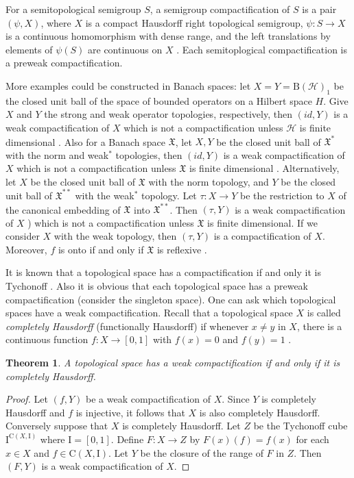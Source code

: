 \documentclass[manuscript]{amsart}
\newtheorem{theorem}{Theorem}[section]
\theoremstyle{definition}
\begin{document}
For a semitopological  semigroup $S$, a semigroup compactification of $S$
is a pair $(\psi,X)$, where $X$ is a compact Hausdorff right topological semigroup,
 $\psi:S\to X$ is a continuous homomorphism with dense range, and the left translations
by elements of $\psi(S)$ are continuous on $X$ \cite[Definition~3.1.1]{bjm89}. Each semitoplogical compactification is a preweak compactification.

More examples could be constructed in Banach spaces: let 
$X=Y=\mathrm{B}(\mathcal{H})_{1}$  be the closed unit ball
of the space of bounded operators on a Hilbert space $H$. Give 
$X$ and $Y$ the strong and weak operator topologies, respectively, then $(id,Y)$ is
a weak compactification of $X$ \cite[Theorem~4.2.4]{mu90} which is not a compactification unless $\mathcal{H}$ is
finite dimensional \cite{ta79}. Also for a Banach space $\mathfrak{X}$, let $X, Y$ be the closed unit ball
of $\mathfrak{X}^{*}$ with the norm and weak$^{*}$ topologies, then $(id,Y)$ is a weak compactification of $X$ which is not a compactification unless $\mathfrak{X}$ is
finite dimensional \cite{co90}.
Alternatively, let  $X$ be the closed unit ball
of $\mathfrak{X}$ with the norm topology, and $Y$ be the closed unit ball
of $\mathfrak{X}^{**}$ with the weak$^{*}$ topology. Let $\tau :X\to Y$ be the restriction to $X$
of the canonical embedding of $\mathfrak{X}$ into $\mathfrak{X}^{**}$. Then $(\tau,Y)$ is a weak compactification of $X$ \cite[Proposition~4.1]{co90}) which is not a compactification unless $\mathfrak{X}$ is
finite dimensional.
If we consider $X$ with  the weak topology, then $(\tau,Y)$ is a compactification of $X$.
Moreover, $f$ is onto if and only if  $\mathfrak{X}$ is reflexive \cite{co90}.

It is known that a topological space has a compactification if and only
it is Tychonoff \cite[Theorem~3.2.6]{en89}. Also it is obvious that each topological
space has a preweak compactification (consider the singleton space).
One can ask  which topological spaces have a weak compactification.
Recall that a topological space $X$ is called \textit{completely Hausdorff} (functionally Hausdorff)
if whenever $x\neq y$ in $X$, there is a continuous
function $f:X\to [0,1]$ with $f(x)=0$ and $f(y)=1$ \cite{wi70}.
\begin{theorem}\label{thrwcom}
A topological space has a weak compactification if and only if it is
completely Hausdorff.
\end{theorem}
\begin{proof}
Let $(f,Y)$ be a weak compactification of $X$. Since $Y$ is completely Hausdorff and
$f$ is injective, it follows that $X$ is also completely Hausdorff.
Conversely suppose that $X$ is completely Hausdorff. Let $Z$ be the
Tychonoff cube $\mathrm{I}^{\mathrm{C}(X,\mathrm{I})}$
where $\mathrm{I}=[0,1]$.
Define  $F:X\to Z$ by $F(x)(f)=f(x)$ for each $x\in X$ and
$f\in \mathrm{C}(X,\mathrm{I})$. Let $Y$ be the closure of the range of $F$
in $Z$. Then $(F,Y)$ is a weak compactification of $X$.
\end{proof}
\end{document}
